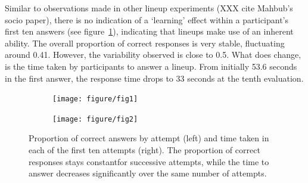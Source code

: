 \documentclass{article}\usepackage[]{graphicx}\usepackage[]{color}
\newenvironment{knitrout}{}{} %
\begin{document}
Similar to observations made in other lineup experiments (XXX cite Mahbub's socio paper), there is no indication of a `learning' effect within a participant's first ten answers (see figure~\ref{fig:attempts}), indicating that lineups make use of an inherent ability. The overall proportion of correct responses is very stable, fluctuating around 0.41. However, the variability observed is close to 0.5. What does change, is the time taken by participants to answer a lineup. From initially 53.6 seconds in the first answer, the response time drops to 33 seconds at the tenth evaluation.
\begin{figure}
\centering
\begin{subfigure}[b]{.3\textwidth}
\begin{knitrout}
\color{fgcolor}
\texttt{[image: figure/fig1]} 

\end{knitrout}

\end{subfigure}
\begin{subfigure}[b]{.3\textwidth}
\begin{knitrout}
\color{fgcolor}
\texttt{[image: figure/fig2]} 

\end{knitrout}

\end{subfigure}
\caption{\label{fig:attempts}Proportion of correct answers by attempt (left) and time taken in each of the first ten attempts (right). The proportion of correct responses stays constantfor successive attempts, while the time to answer decreases significantly over the same number of attempts.}
\end{figure}



\end{document}
